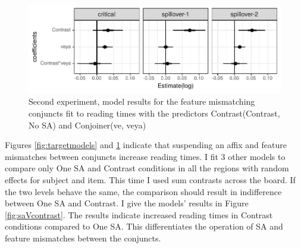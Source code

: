 \begin{knitrout}
\color{fgcolor}\begin{figure}[hbt!]

{\centering \includegraphics[]{experiments/selfpaced/report/figure/contrastmodels-1.pdf} 

}

\caption[Second experiment, model results for the feature mismatching conjuncts fit to reading times with the predictors Contrast(Contrast, No SA) and Conjoiner(ve, veya)]{Second experiment, model results for the feature mismatching conjuncts fit to reading times with the predictors Contrast(Contrast, No SA) and Conjoiner(ve, veya)}\label{fig:contrastmodels}
\end{figure}


\end{knitrout}

Figures \ref{fig:targetmodels} and \ref{fig:contrastmodels} indicate that suspending an affix and feature mismatches between conjuncts increase reading times. I fit 3 other models to compare only One SA and Contrast conditions in all the regions with random effects for subject and item. This time I used sum contrasts across the board. If the two levels behave the same, the comparison should result in indifference between One SA and Contrast. I give the models' results in Figure \ref{fig:saVcontrast}. The results indicate increased reading times in Contrast conditions compared to One SA. This differentiates the operation of SA and feature mismatches between the conjuncts.

